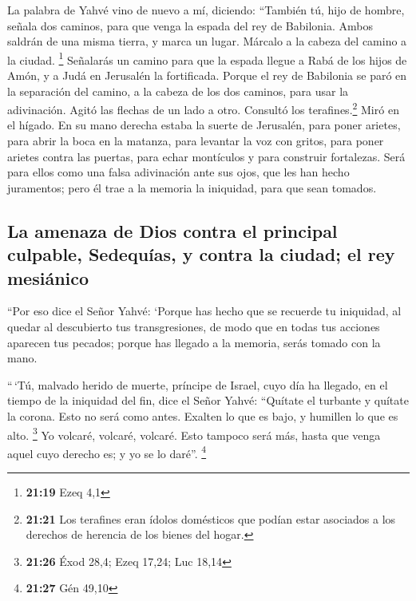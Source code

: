  La palabra de Yahvé vino de nuevo a mí, diciendo:
 ``También tú, hijo de hombre, señala dos caminos, para
que venga la espada del rey de Babilonia. Ambos saldrán de una misma
tierra, y marca un lugar. Márcalo a la cabeza del camino a la ciudad.
\footnote{\textbf{21:19} Ezeq 4,1}  Señalarás un camino
para que la espada llegue a Rabá de los hijos de Amón, y a Judá en
Jerusalén la fortificada.  Porque el rey de Babilonia se
paró en la separación del camino, a la cabeza de los dos caminos, para
usar la adivinación. Agitó las flechas de un lado a otro. Consultó los
terafines.\footnote{\textbf{21:21} Los terafines eran ídolos domésticos
  que podían estar asociados a los derechos de herencia de los bienes
  del hogar.} Miró en el hígado.  En su mano derecha
estaba la suerte de Jerusalén, para poner arietes, para abrir la boca en
la matanza, para levantar la voz con gritos, para poner arietes contra
las puertas, para echar montículos y para construir fortalezas.
 Será para ellos como una falsa adivinación ante sus
ojos, que les han hecho juramentos; pero él trae a la memoria la
iniquidad, para que sean tomados.

\hypertarget{la-amenaza-de-dios-contra-el-principal-culpable-sedequuxedas-y-contra-la-ciudad-el-rey-mesiuxe1nico}{%
\subsection{La amenaza de Dios contra el principal culpable, Sedequías,
y contra la ciudad; el rey
mesiánico}\label{la-amenaza-de-dios-contra-el-principal-culpable-sedequuxedas-y-contra-la-ciudad-el-rey-mesiuxe1nico}}

 ``Por eso dice el Señor Yahvé: `Porque has hecho que se
recuerde tu iniquidad, al quedar al descubierto tus transgresiones, de
modo que en todas tus acciones aparecen tus pecados; porque has llegado
a la memoria, serás tomado con la mano.

 ``\,`Tú, malvado herido de muerte, príncipe de Israel,
cuyo día ha llegado, en el tiempo de la iniquidad del fin,
 dice el Señor Yahvé: ``Quítate el turbante y quítate la
corona. Esto no será como antes. Exalten lo que es bajo, y humillen lo
que es alto. \footnote{\textbf{21:26} Éxod 28,4; Ezeq 17,24; Luc 18,14}
 Yo volcaré, volcaré, volcaré. Esto tampoco será más,
hasta que venga aquel cuyo derecho es; y yo se lo daré''. \footnote{\textbf{21:27}
  Gén 49,10}

